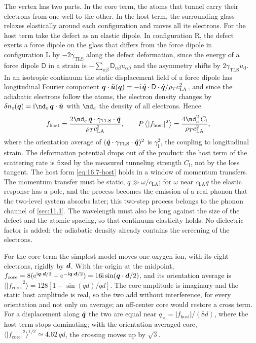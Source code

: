 The vertex has two parts. In the core term, the atoms that tunnel carry their electrons from one well to the other. In the host term, the surrounding glass relaxes elastically around each configuration and moves all its electrons. For the host term take the defect as an elastic dipole. In configuration R, the defect exerts a force dipole on the glass that differs from the force dipole in configuration L by $-2\gamma_{\mathrm{TLS}}$ along the defect deformation, since the energy of a force dipole $\mathsf{D}$ in a strain is $-\sum_{\alpha\beta}\mathsf{D}_{\alpha\beta}u_{\alpha\beta}$ and the asymmetry shifts by $2\gamma_{\mathrm{TLS}}u_{\mathrm{d}}$. In an isotropic continuum the static displacement field of a force dipole has longitudinal Fourier component $\bm{q}\cdot\tilde{\bm{u}}(\bm{q}) = -\mathrm{i}\,\hat{\bm{q}}\cdot\mathsf{D}\cdot\hat{\bm{q}}/\rho_Tc_{\mathrm{LA}}^2$, and since the adiabatic electrons follow the atoms, the electron density changes by $\delta n_e(\vect{q}) = \ii\nd_e\,\vect{q}\cdot\tilde{\vect{u}}$ with $\nd_e$ the density of all electrons. Hence
\begin{equation}
  f_{\mathrm{host}} = \frac{2\nd_e\,\hat{\vect{q}}\cdot\gamma_{\mathrm{TLS}}\cdot\hat{\vect{q}}}{\rho_Tc_{\mathrm{LA}}^2} ,
  \qquad
  \bar P\,\bigl\langle|f_{\mathrm{host}}|^2\bigr\rangle = \frac{4\nd_e^2\,C_{\mathrm{l}}}{\rho_Tc_{\mathrm{LA}}^2} ,
  \label{eq:16.7-host}
\end{equation}
where the orientation average of $(\hat{\bm{q}}\cdot\gamma_{\mathrm{TLS}}\cdot\hat{\bm{q}})^2$ is $\gamma_{\mathrm{l}}^2$, the coupling to longitudinal strain. The deformation potential drops out of the product: the host term of the scattering rate is fixed by the measured tunneling strength $C_{\mathrm{l}}$, not by the loss tangent. The host form \cref{eq:16.7-host} holds in a window of momentum transfers. The momentum transfer must be static, $q \gg \omega/c_{\mathrm{LA}}$; for $\omega$ near $c_{\mathrm{LA}}q$ the elastic response has a pole, and the process becomes the emission of a real phonon that the two-level system absorbs later; this two-step process belongs to the phonon channel of \cref{sec:11.1}. The wavelength must also be long against the size of the defect and the atomic spacing, so that continuum elasticity holds. No dielectric factor is added: the adiabatic density already contains the screening of the electrons.

For the core term the simplest model moves one oxygen ion, with its eight electrons, rigidly by $\bm{d}$. With the origin at the midpoint, $f_{\mathrm{core}} = 8(\mathrm{e}^{\mathrm{i}\bm{q}\cdot\bm{d}/2} - \mathrm{e}^{-\mathrm{i}\bm{q}\cdot\bm{d}/2}) = 16\mathrm{i}\sin(\bm{q}\cdot\bm{d}/2)$, and its orientation average is $\langle|f_{\mathrm{core}}|^2\rangle = 128[1 - \sin(qd)/qd]$. The core amplitude is imaginary and the static host amplitude is real, so the two add without interference, for every orientation and not only on average; an off-center core would restore a cross term. For a displacement along $\hat{\bm{q}}$ the two are equal near $q_\times = |f_{\mathrm{host}}|/(8d)$, where the host term stops dominating; with the orientation-averaged core, $\langle|f_{\mathrm{core}}|^2\rangle^{1/2} \simeq 4.62\,qd$, the crossing moves up by $\sqrt3$.

